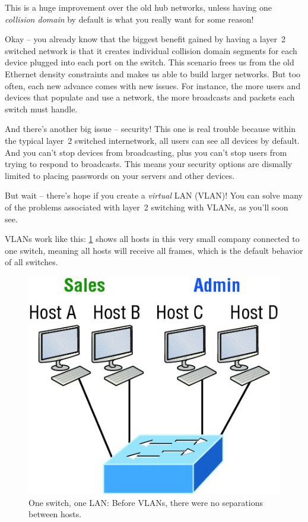This is a huge improvement over the old hub networks, unless having one
\emph{collision domain} by default is what you really want for some
reason!

Okay -- you already know that the biggest benefit gained by having a layer~2 switched network is that it creates individual collision domain
segments for each device plugged into each port on the switch. This
scenario frees us from the old Ethernet density constraints and makes us
able to build larger networks. But too often, each new advance comes
with new issues. For instance, the more users and devices that populate
and use a network, the more broadcasts and packets each switch must
handle.

And there's another
big issue -- security! This one is real trouble because within the
typical layer~2 switched internetwork, all users can see all devices by
default. And you can't stop devices from broadcasting, plus you can't
stop users from trying to respond to broadcasts. This means your
security options are dismally limited to placing passwords on your
servers and other devices.

But wait -- there's hope if you create a \emph{virtual} LAN (VLAN)!
You can solve many of the problems associated with layer~2 switching with VLANs, as you'll soon see.

VLANs work like this: \cref{fig:one-switch-one-lan} shows all hosts in this very small company connected to one switch, meaning all hosts will receive all frames, which is the default behavior of all switches.

\begin{figure}
   \centering
   \includegraphics{images/c11f003.jpg}
   \caption[One switch, one LAN]{One switch, one LAN: Before VLANs, there were no separations between hosts.}
   \label{fig:one-switch-one-lan}
\end{figure}

